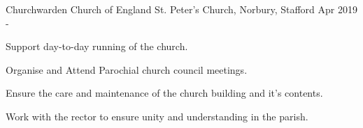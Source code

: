 

\begin{cventries}

	\cventry
	{Churchwarden} %
	{Church of England} %
	{St. Peter's Church, Norbury, Stafford} %
	{Apr 2019 -} %
	{
		\begin{cvitems} %
		\item {Support day-to-day running of the church.}
		\item {Organise and Attend Parochial church council meetings.}
		\item {Ensure the care and maintenance of the church building and it's contents.}
		\item {Work with the rector to ensure unity and understanding in the parish.}
		\end{cvitems}
	}
\end{cventries}
